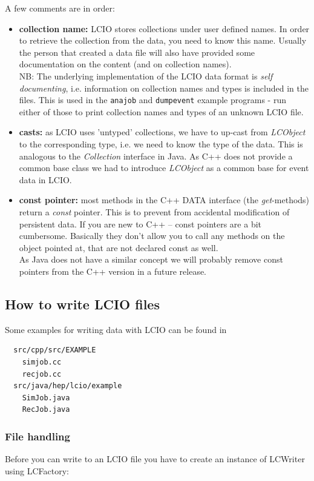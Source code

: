 \documentclass[twoside]{article}
\begin{document}
A few comments are in order:
\begin{itemize}
\item{ {\bf collection name:} LCIO stores collections under user defined names. In order to retrieve 
the collection from the data, you need to know this name. Usually the person that created a data 
file will also have provided some documentation on the content (and on collection names). \\
NB: The underlying implementation of the LCIO data format is {\em self documenting}, i.e. information
on collection names and types is included in the files. This is used in the \verb$anajob$ and 
\verb$dumpevent$ example programs - run either of those to print collection names and 
types of an unknown LCIO file.
}

\item{ {\bf casts:} as LCIO uses 'untyped' collections, we have to up-cast from {\em LCObject} to 
the corresponding type, i.e. we need to know the type of the data. This is analogous to the 
{\em Collection} interface in Java. As C++ does not provide a common base class we had to 
introduce {\em LCObject} as a common base for event data in LCIO.
}

\item{ {\bf const pointer: } most methods in the C++ DATA interface (the {\em get}-methods) 
return a {\em const} pointer. This is to prevent from accidental modification of persistent data.
If you are  new to C++ -- const pointers are a bit cumbersome. Basically they don't allow you to call
any methods on the object pointed at, that are not declared const as well. \\
As Java does not have a similar concept we will probably remove const pointers from the C++
version in a future release.
}
\end {itemize}


\subsection{How to write LCIO files}

Some examples for writing data with LCIO can be found in
\begin{verbatim}
  src/cpp/src/EXAMPLE
    simjob.cc
    recjob.cc
  src/java/hep/lcio/example
    SimJob.java
    RecJob.java
\end{verbatim}

\subsubsection{File handling}
Before you can write to an LCIO file you have to create an instance of LCWriter using LCFactory:
\end{document}
